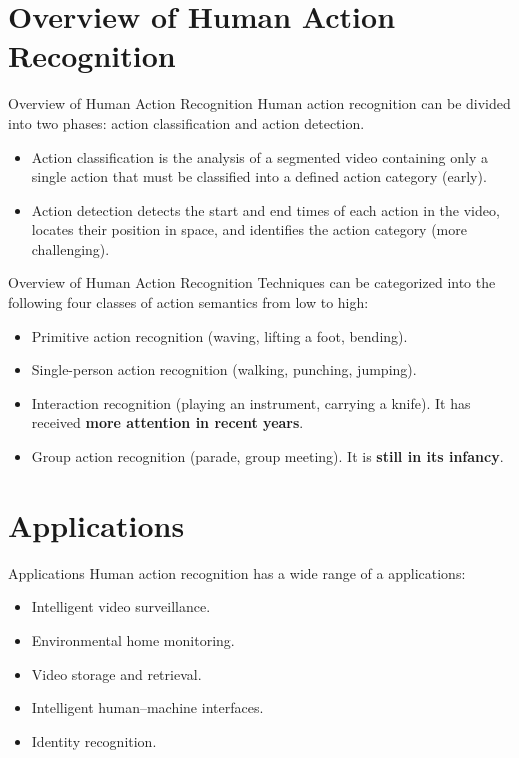 
\section{Overview of Human Action Recognition}
\begin{frame}{Overview of Human Action Recognition}
    Human action recognition can be divided into two phases: action classification and action detection.
    \begin{itemize}
        \item Action classification is the analysis of a segmented video containing only a single action that must be classified into a defined action category (early).
        \item Action detection detects the start and end times of each action in the video, locates their position in space, and identifies the action category (more challenging).
    \end{itemize}
\end{frame}

\begin{frame}{Overview of Human Action Recognition}
    Techniques can be categorized into the following four classes of action semantics from low to high:
    \begin{itemize}
        \item Primitive action recognition (waving, lifting a foot, bending).
        \item Single-person action recognition (walking, punching, jumping).
        \item Interaction recognition (playing an instrument, carrying a knife). It has received \textbf{more attention in recent years}.
        \item Group action recognition (parade, group meeting). It is \textbf{still in its infancy}.
    \end{itemize}
\end{frame}

\section{Applications}
\begin{frame}{Applications}
    Human action recognition has a wide range of a applications:

    \begin{itemize}
        \item Intelligent video surveillance.
        \item Environmental home monitoring.
        \item Video storage and retrieval.
        \item Intelligent human–machine interfaces.
        \item Identity recognition.
    \end{itemize}
\end{frame}

